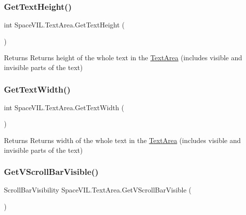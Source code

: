 \subsubsection{\texorpdfstring{Get\+Text\+Height()}{GetTextHeight()}}
{\footnotesize\ttfamily int Space\+V\+I\+L.\+Text\+Area.\+Get\+Text\+Height (\begin{DoxyParamCaption}{ }\end{DoxyParamCaption})\hspace{0.3cm}{\ttfamily [inline]}}

\begin{DoxyReturn}{Returns}
Returns height of the whole text in the \mbox{\hyperlink{class_space_v_i_l_1_1_text_area}{Text\+Area}} (includes visible and invisible parts of the text) 
\end{DoxyReturn}
\mbox{\label{class_space_v_i_l_1_1_text_area_a19980d0c54de49f002d4ab25361ace48}} 
\subsubsection{\texorpdfstring{Get\+Text\+Width()}{GetTextWidth()}}
{\footnotesize\ttfamily int Space\+V\+I\+L.\+Text\+Area.\+Get\+Text\+Width (\begin{DoxyParamCaption}{ }\end{DoxyParamCaption})\hspace{0.3cm}{\ttfamily [inline]}}

\begin{DoxyReturn}{Returns}
Returns width of the whole text in the \mbox{\hyperlink{class_space_v_i_l_1_1_text_area}{Text\+Area}} (includes visible and invisible parts of the text) 
\end{DoxyReturn}
\mbox{\label{class_space_v_i_l_1_1_text_area_a431947482c1e18238219b5e14801b99f}} 
\subsubsection{\texorpdfstring{Get\+V\+Scroll\+Bar\+Visible()}{GetVScrollBarVisible()}}
{\footnotesize\ttfamily Scroll\+Bar\+Visibility Space\+V\+I\+L.\+Text\+Area.\+Get\+V\+Scroll\+Bar\+Visible (\begin{DoxyParamCaption}{ }\end{DoxyParamCaption})\hspace{0.3cm}{\ttfamily [inline]}}



